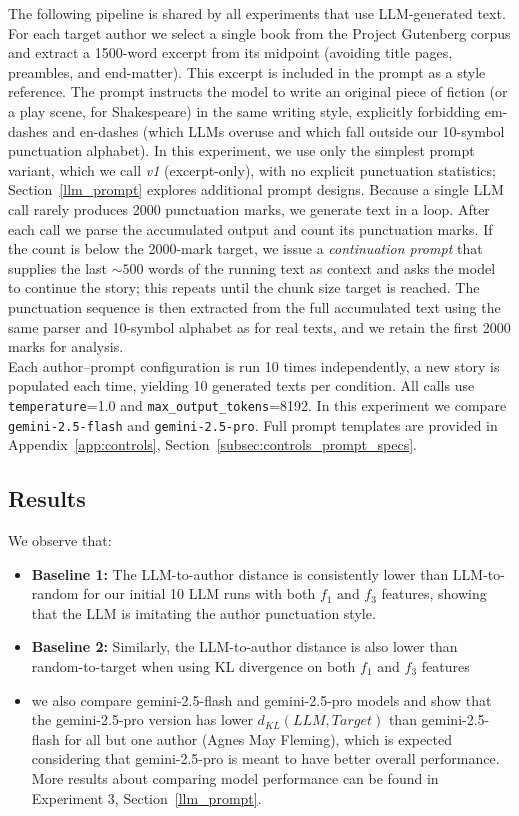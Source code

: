 \documentclass{article}
\begin{document}
The following pipeline is shared by all experiments that use LLM-generated text.  For each target author we select a single book from the Project Gutenberg corpus and extract a 1500-word excerpt from its midpoint (avoiding title pages, preambles, and end-matter).  This excerpt is included in the prompt as a style reference. The prompt instructs the model to write an original piece of fiction (or a play scene, for Shakespeare) in the same writing style, explicitly forbidding em-dashes and en-dashes (which LLMs overuse and which fall outside our 10-symbol punctuation alphabet).  In this experiment, we use only the simplest prompt variant, which we call \textit{v1} (excerpt-only), with no explicit punctuation statistics; Section~\ref{llm_prompt} explores additional prompt designs.
Because a single LLM call rarely produces 2000 punctuation marks, we generate text in a loop. After each call we parse the accumulated output and count its punctuation marks.  If the count is below the 2000-mark target, we issue a \emph{continuation prompt} that supplies the last ${\sim}500$ words of the running text as context and asks the model to continue the story; this repeats until the chunk size target is reached.  The punctuation sequence is then extracted from the full accumulated text using the same parser and 10-symbol alphabet as for real texts, and we retain the first 2000 marks for analysis.\\

Each author--prompt configuration is run 10 times independently, a new story is populated each time, yielding 10 generated texts per condition.  All calls use \texttt{temperature}=1.0 and \texttt{max\_output\_tokens}=8192.  In this experiment we compare \texttt{gemini-2.5-flash} and \texttt{gemini-2.5-pro}.  Full prompt templates are provided in Appendix~\ref{app:controls}, Section~\ref{subsec:controls_prompt_specs}.


\subsection{Results}
We observe that:
\begin{itemize}
    \item \textbf{Baseline 1:} The LLM-to-author distance is consistently lower than LLM-to-random for our initial 10 LLM runs with both $f_1$ and $f_3$ features, showing that the LLM is imitating the author punctuation style.
    \item \textbf{Baseline 2:}  Similarly, the LLM-to-author distance is also lower than random-to-target when using KL divergence on both $f_1$ and $f_3$ features
    \item we also compare gemini-2.5-flash and gemini-2.5-pro models and show that the gemini-2.5-pro version has lower $d_{KL}(LLM, Target)$ than gemini-2.5-flash for all but one author (Agnes May Fleming), which is expected considering that gemini-2.5-pro is meant to have better overall performance. More results about comparing model performance can be found in Experiment 3, Section~\ref{llm_prompt}.
\end{itemize}
\end{document}
